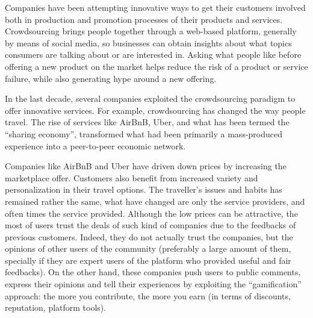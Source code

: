 Companies have been attempting innovative ways to get their customers involved both in production and promotion processes of their products and services. Crowdsourcing brings people together through a web-based platform, %
generally by means of social media, so businesses can obtain insights about what topics consumers are talking about or are interested in.
Asking what people like before offering a new product on the market helps reduce the risk of a product or service failure, while also generating hype around a new offering.

In the last decade, several companies exploited the crowdsourcing paradigm to offer innovative services. For example, crowdsourcing has changed the way people travel. The rise of services like AirBnB, Uber, and what has been termed the ``sharing economy'', transformed what had been primarily a mass-produced experience into a peer-to-peer economic network.

Companies like AirBnB and Uber have driven down prices by increasing the marketplace offer. Customers also benefit from increased variety and personalization in their travel options. 
The traveller’s issues and habits has remained rather the same, what have changed are only the service providers, and often times the service provided. %
Although the low prices can be attractive, the most of users trust the deals of such kind of companies due to the feedbacks of previous customers. Indeed, they do not actually trust the companies, but the opinions of other users of the community (preferably a large amount of them, specially if they are expert users of the platform who provided useful and fair feedbacks). On the other hand, these companies push users to public comments, express their opinions and tell their experiences by exploiting the ``gamification'' approach: the more you contribute, the more you earn (in terms of discounts, reputation, platform tools). 

